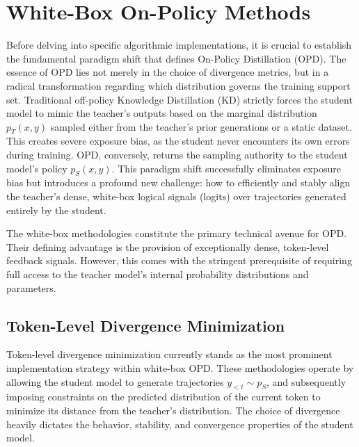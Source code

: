 \section{White-Box On-Policy Methods}
\label{sec:white_box}

Before delving into specific algorithmic implementations, it is crucial to establish the fundamental paradigm shift that defines On-Policy Distillation (OPD). The essence of OPD lies not merely in the choice of divergence metrics, but in a radical transformation regarding which distribution governs the training support set. Traditional off-policy Knowledge Distillation (KD) strictly forces the student model to mimic the teacher's outputs based on the marginal distribution $p_T(x, y)$ sampled either from the teacher's prior generations or a static dataset. This creates severe exposure bias, as the student never encounters its own errors during training. OPD, conversely, returns the sampling authority to the student model's policy $p_S(x, y)$. This paradigm shift successfully eliminates exposure bias but introduces a profound new challenge: how to efficiently and stably align the teacher's dense, white-box logical signals (logits) over trajectories generated entirely by the student. 

The white-box methodologies constitute the primary technical avenue for OPD. Their defining advantage is the provision of exceptionally dense, token-level feedback signals. However, this comes with the stringent prerequisite of requiring full access to the teacher model's internal probability distributions and parameters.

\subsection{Token-Level Divergence Minimization}
\label{subsec:token_level}

Token-level divergence minimization currently stands as the most prominent implementation strategy within white-box OPD. These methodologies operate by allowing the student model to generate trajectories $y_{<t} \sim p_S$, and subsequently imposing constraints on the predicted distribution of the current token to minimize its distance from the teacher's distribution. The choice of divergence heavily dictates the behavior, stability, and convergence properties of the student model.

